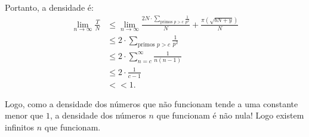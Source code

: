 \documentclass[10pt,a4paper]{article}
\begin{document}
\begin{sk}
\begin{dem}
			Portanto, a densidade é:
			\begin{align*}
				\lim_{n\to\infty}\frac{T}{N} &\le \lim_{n\to\infty} \frac{2N \cdot \sum_{\text{primos $p > c$}}\frac{1}{p^2}}{N} + \frac{\pi(\sqrt{bN+y})}{N}\\
				& \le 2 \cdot \sum_{\text{primos $p > c$}} \frac{1}{p^2}\\
				& \le 2 \cdot \sum_{n = c}^\infty \frac{1}{n(n-1)}\\
				& \le 2 \cdot \frac{1}{c-1}\\
				& << 1.
			\end{align*}

			Logo, como a densidade dos números que não funcionam tende a uma constante menor que $1$, a densidade dos números $n$ que funcionam é não nula! Logo existem infinitos $n$ que funcionam.
		\end{dem}
	\end{sk}



	\newpage

	\newpage
\end{document}
